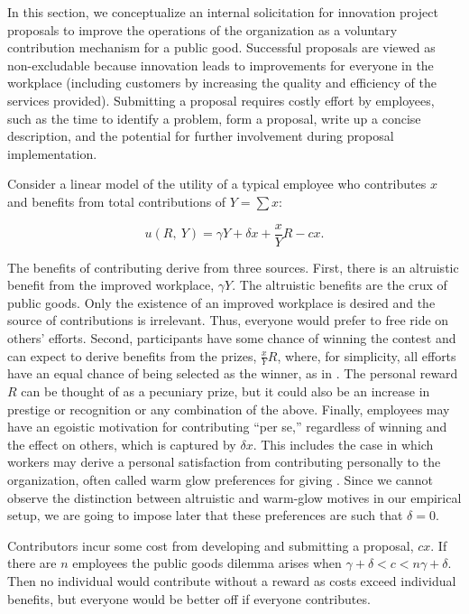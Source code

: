 \documentclass[11pt, titlepage]{article}
\begin{document}
In this section, we conceptualize an internal solicitation for
innovation project proposals to improve the operations of the
organization as a voluntary contribution mechanism for a public good.
Successful proposals are viewed as non-excludable because innovation
leads to improvements for everyone in the workplace (including customers
by increasing the quality and efficiency of the services provided).
Submitting a proposal requires costly effort by employees, such as the
time to identify a problem, form a proposal, write up a concise
description, and the potential for further involvement during proposal
implementation.

Consider a linear model of the utility of a typical employee who
contributes \(x\) and benefits from total contributions of \(Y=\sum x\):

\begin{equation} \label{eq:utility}
  u(R,~ Y) =  \gamma Y + \delta x + \frac{x}{Y} R - c x.
\end{equation}

The benefits of contributing derive from three sources. First, there is
an altruistic benefit from the improved workplace, \(\gamma Y\). The
altruistic benefits are the crux of public goods. Only the existence of
an improved workplace is desired and the source of contributions is
irrelevant. Thus, everyone would prefer to free ride on others' efforts.
Second, participants have some chance of winning the contest and can
expect to derive benefits from the prizes, \(\frac{x}{Y} R\), where, for
simplicity, all efforts have an equal chance of being selected as the
winner, as in \citet{morgan2000financing}. The personal reward \(R\) can
be thought of as a pecuniary prize, but it could also be an increase in
prestige or recognition or any combination of the above. Finally,
employees may have an egoistic motivation for contributing ``per se,''
regardless of winning and the effect on others, which is captured by
\(\delta x\). This includes the case in which workers may derive a
personal satisfaction from contributing personally to the organization,
often called warm glow preferences for giving \citep{andreoni1995warm}.
Since we cannot observe the distinction between altruistic and warm-glow
motives in our empirical setup, we are going to impose later that these
preferences are such that \(\delta=0\).

Contributors incur some cost from developing and submitting a proposal,
\(c x\). If there are \(n\) employees the public goods dilemma arises
when \(\gamma+\delta < c < n\gamma+\delta\). Then no individual would
contribute without a reward as costs exceed individual benefits, but
everyone would be better off if everyone contributes.
\end{document}
